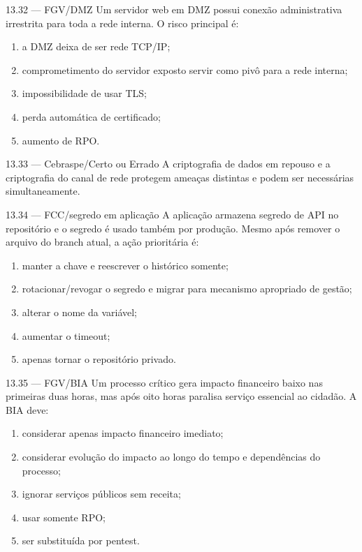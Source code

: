 \begin{questao}{ 13.32 — FGV/DMZ}
Um servidor web em DMZ possui conexão administrativa irrestrita para toda a rede interna. O risco principal é:
\begin{enumerate}[label=\Alph*)]
\item a DMZ deixa de ser rede TCP/IP;
\item comprometimento do servidor exposto servir como pivô para a rede interna;
\item impossibilidade de usar TLS;
\item perda automática de certificado;
\item aumento de RPO.
\end{enumerate}
\end{questao}

\begin{questao}{ 13.33 — Cebraspe/Certo ou Errado}
A criptografia de dados em repouso e a criptografia do canal de rede protegem ameaças distintas e podem ser necessárias simultaneamente.
\end{questao}

\begin{questao}{ 13.34 — FCC/segredo em aplicação}
A aplicação armazena segredo de API no repositório e o segredo é usado também por produção. Mesmo após remover o arquivo do branch atual, a ação prioritária é:
\begin{enumerate}[label=\Alph*)]
\item manter a chave e reescrever o histórico somente;
\item rotacionar/revogar o segredo e migrar para mecanismo apropriado de gestão;
\item alterar o nome da variável;
\item aumentar o timeout;
\item apenas tornar o repositório privado.
\end{enumerate}
\end{questao}

\begin{questao}{ 13.35 — FGV/BIA}
Um processo crítico gera impacto financeiro baixo nas primeiras duas horas, mas após oito horas paralisa serviço essencial ao cidadão. A BIA deve:
\begin{enumerate}[label=\Alph*)]
\item considerar apenas impacto financeiro imediato;
\item considerar evolução do impacto ao longo do tempo e dependências do processo;
\item ignorar serviços públicos sem receita;
\item usar somente RPO;
\item ser substituída por pentest.
\end{enumerate}
\end{questao}

